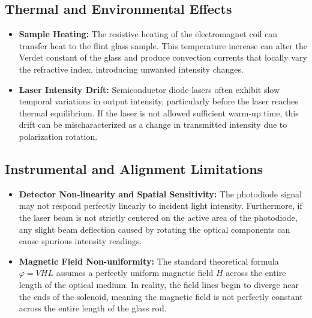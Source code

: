 \subsection{Thermal and Environmental Effects}
\begin{itemize}
    \item \textbf{Sample Heating:} The resistive heating of the electromagnet coil can transfer heat to the flint glass sample. This temperature increase can alter the Verdet constant of the glass and produce convection currents that locally vary the refractive index, introducing unwanted intensity changes.
    \item \textbf{Laser Intensity Drift:} Semiconductor diode lasers often exhibit slow temporal variations in output intensity, particularly before the laser reaches thermal equilibrium. If the laser is not allowed sufficient warm-up time, this drift can be mischaracterized as a change in transmitted intensity due to polarization rotation.
\end{itemize}

\subsection{Instrumental and Alignment Limitations}
\begin{itemize}
    \item \textbf{Detector Non-linearity and Spatial Sensitivity:} The photodiode signal may not respond perfectly linearly to incident light intensity. Furthermore, if the laser beam is not strictly centered on the active area of the photodiode, any slight beam deflection caused by rotating the optical components can cause spurious intensity readings.
    \item \textbf{Magnetic Field Non-uniformity:} The standard theoretical formula $\varphi = VHL$ assumes a perfectly uniform magnetic field $H$ across the entire length of the optical medium. In reality, the field lines begin to diverge near the ends of the solenoid, meaning the magnetic field is not perfectly constant across the entire length of the glass rod.
\end{itemize}

